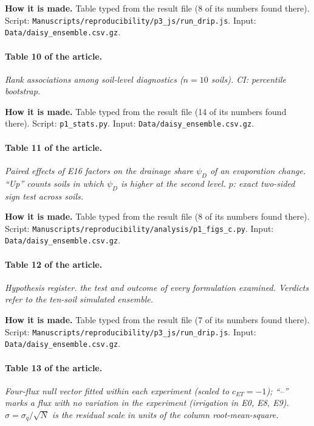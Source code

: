 \textbf{How it is made.} Table typed from the result file (8 of its numbers found there). Script: \nolinkurl{Manuscripts/reproducibility/p3_js/run_drip.js}. Input: \nolinkurl{Data/daisy_ensemble.csv.gz}.

\paragraph{Table 10 of the article.} \emph{Rank associations among soil-level diagnostics ($n=10$ soils). CI: percentile bootstrap.}

\textbf{How it is made.} Table typed from the result file (14 of its numbers found there). Script: \nolinkurl{p1_stats.py}. Input: \nolinkurl{Data/daisy_ensemble.csv.gz}.

\paragraph{Table 11 of the article.} \emph{Paired effects of E16 factors on the drainage share $\psi_D$ of an evaporation change. ``Up'' counts soils in which $\psi_D$ is higher at the second level. $p$: exact two-sided sign test across soils.}

\textbf{How it is made.} Table typed from the result file (8 of its numbers found there). Script: \nolinkurl{Manuscripts/reproducibility/analysis/p1_figs_c.py}. Input: \nolinkurl{Data/daisy_ensemble.csv.gz}.

\paragraph{Table 12 of the article.} \emph{Hypothesis register. the test and outcome of every formulation examined. Verdicts refer to the ten-soil simulated ensemble.}

\textbf{How it is made.} Table typed from the result file (7 of its numbers found there). Script: \nolinkurl{Manuscripts/reproducibility/p3_js/run_drip.js}. Input: \nolinkurl{Data/daisy_ensemble.csv.gz}.

\paragraph{Table 13 of the article.} \emph{Four-flux null vector fitted within each experiment (scaled to $c_{\mathit{ET}}=-1$); ``--'' marks a flux with no variation in the experiment (irrigation in E0, E8, E9). $\hat\sigma=\sigma_q/\sqrt N$ is the residual scale in units of the column root-mean-square.}

